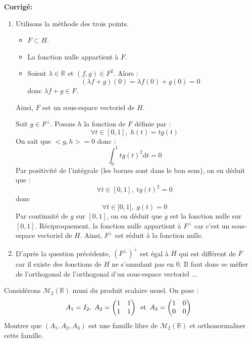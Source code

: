 \documentclass[a4paper,twoside,french,11pt]{VcCours}
\newcommand{\dt}{\text{d}t}
\newcommand{\corr}{\textbf{Corrigé:}}
\begin{document}
\corr 

\begin{enumerate}
\item Utilisons la méthode des trois points.
\begin{itemize}
\item $F \subset H$.
\item La fonction nulle appartient à $F$.
\item Soient $\lambda \in \mathbb{R}$ et $(f,g) \in F^2$. Alors :
$$ (\lambda f+g)(0) = \lambda f(0)+g(0) = 0$$
donc $\lambda f+g \in F$.
\end{itemize}
Ainsi, $F$ est un sous-espace vectoriel de $H$.


\noindent Soit $g \in F^{\perp}$. Posons $h$ la fonction de $F$ définie par :
$$ \forall t \in [0,1], \; h(t)=tg(t)$$
On sait que $<g,h>=0$ donc :
$$ \int_0^1 t g(t)^2 \dt =0$$
Par positivité de l'intégrale (les bornes sont dans le bon sens), on en déduit que :
$$ \forall t \in [0,1], \; t g(t)^2=0$$
donc 
$$ \forall t \in ]0,1], \; g(t)=0$$
Par continuité de $g$ sur $[0,1]$, on en déduit que $g$ est la fonction nulle sur $[0,1]$. Réciproquement, la fonction nulle appartient à $F^{\perp}$ car c'est un sous-espace vectoriel de $H$. Ainsi, $F^{\perp}$ est réduit à la fonction nulle.
\item D'après la question précédente, $(F^{\perp})^{\perp}$ est égal à $H$ qui est différent de $F$ car il existe des fonctions de $H$ ne s'annulant pas en $0$. Il faut donc se méfier de l'orthogonal de l'orthogonal d'un sous-espace vectoriel ...
\end{enumerate}

\begin{Exercice}{} Considérons $\mathcal{M}_2(\mathbb{R})$ muni du produit scalaire usuel. On pose :
$$A_1 = I_2, \; A_2 = \begin{pmatrix}
1 & 1 \\
1 & 1 \\
\end{pmatrix} \, \hbox{ et } \, A_3 = \begin{pmatrix}
1 & 0 \\
0 & 0
\end{pmatrix}$$
Montrer que $(A_1,A_2,A_3)$ est une famille libre de $\mathcal{M}_2(\mathbb{R})$ et orthonormaliser cette famille.
\end{Exercice}
\end{document}
